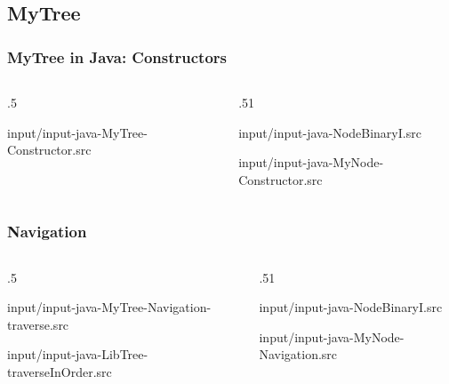 \documentclass[10pt]{beamer}
\begin{document}
\subsection{MyTree}
\begin{frame}[t]\frametitle{MyTree in Java: Constructors}
	\vspace{-0.3cm}
	\begin{columns}[T] %
	\begin{column}{.5\linewidth} %
		{\tiny 
			
				{input/input-java-MyTree-Constructor.src}
		} %
	\end{column} %
	\begin{column}{.51\linewidth} %
		{\tiny 
			
				{input/input-java-NodeBinaryI.src}
		} %
		{\tiny 
			
				{input/input-java-MyNode-Constructor.src}
		} %
	\end{column} %
	\end{columns} %

\end{frame}








\begin{frame}[t]\frametitle{Navigation}
	\vspace{-0.3cm}
	\begin{columns}[T] %
	\begin{column}{.5\linewidth} %
		\vspace{-0.3cm}
		{\tiny 
			
				{input/input-java-MyTree-Navigation-traverse.src}
		} %
		{\tiny 
			
				{input/input-java-LibTree-traverseInOrder.src}
		} %
	\end{column} %
	\begin{column}{.51\linewidth} %
		\vspace{-0.3cm}
		{\tiny 
			
				{input/input-java-NodeBinaryI.src}
		} %
		{\tiny 
			
				{input/input-java-MyNode-Navigation.src}
		} %
	\end{column} %
	\end{columns} %

\end{frame}
\end{document}
